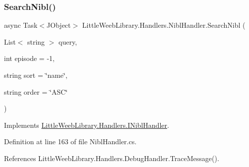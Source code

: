 \subsubsection{\texorpdfstring{Search\+Nibl()}{SearchNibl()}\hspace{0.1cm}{\footnotesize\ttfamily [2/2]}}
{\footnotesize\ttfamily async Task$<$J\+Object$>$ Little\+Weeb\+Library.\+Handlers.\+Nibl\+Handler.\+Search\+Nibl (\begin{DoxyParamCaption}\item[{List$<$ string $>$}]{query,  }\item[{int}]{episode = {\ttfamily -\/1},  }\item[{string}]{sort = {\ttfamily \char`\"{}name\char`\"{}},  }\item[{string}]{order = {\ttfamily \char`\"{}ASC\char`\"{}} }\end{DoxyParamCaption})}



Implements \mbox{\hyperlink{interface_little_weeb_library_1_1_handlers_1_1_i_nibl_handler_aea34d508a803bf76f119e95b6e9e9cf0}{Little\+Weeb\+Library.\+Handlers.\+I\+Nibl\+Handler}}.



Definition at line 163 of file Nibl\+Handler.\+cs.



References Little\+Weeb\+Library.\+Handlers.\+Debug\+Handler.\+Trace\+Message().


